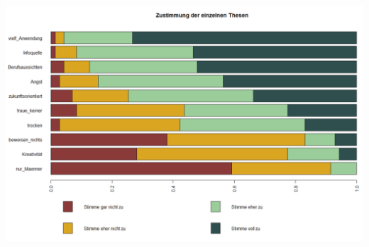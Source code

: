 \documentclass[12pt,a4paper,titlepage=true,parskip,ngerman]{scrartcl}
\begin{document}
\includegraphics[scale=0.48]{gestapelter_Barplot_Thesen}
\vspace{0.2cm}
\end{document}
